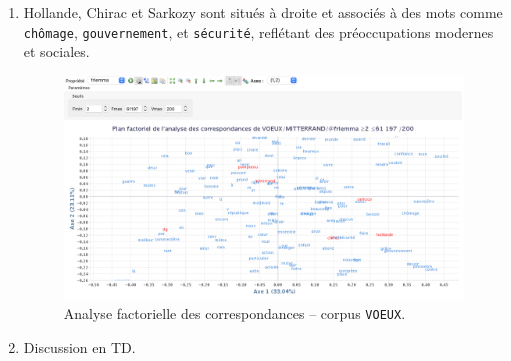 \documentclass[xcolor={table,usenames,dvipsnames}]{article}
\begin{document}
\begin{enumerate}
 	\item Hollande, Chirac et Sarkozy sont situés à droite et associés à des mots comme \texttt{chômage}, \texttt{gouvernement}, et \texttt{sécurité}, reflétant des préoccupations modernes et sociales.
 	 	 	\begin{figure}[!h] %
 		\centering
 		\includegraphics[width=1\linewidth]{img/afc.png}
 		\caption{Analyse factorielle des correspondances -- corpus \texttt{VOEUX}.}
 		\label{fig:usa_algerie}
 	\end{figure}
 	
 	\item Discussion en TD.

\end{enumerate}
 
 	
		\printbibliography



	
\end{document}
